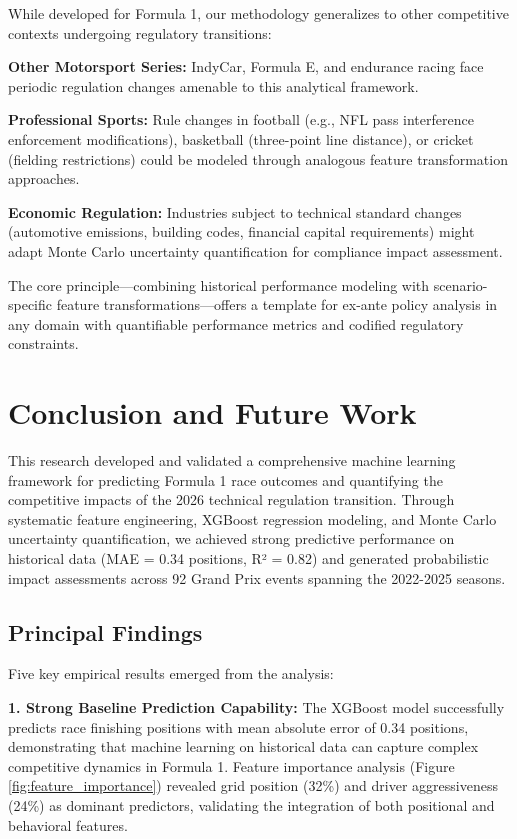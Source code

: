 \documentclass[conference]{IEEEtran}
\begin{document}
While developed for Formula 1, our methodology generalizes to other competitive contexts undergoing regulatory transitions:

\textbf{Other Motorsport Series:} IndyCar, Formula E, and endurance racing face periodic regulation changes amenable to this analytical framework.

\textbf{Professional Sports:} Rule changes in football (e.g., NFL pass interference enforcement modifications), basketball (three-point line distance), or cricket (fielding restrictions) could be modeled through analogous feature transformation approaches.

\textbf{Economic Regulation:} Industries subject to technical standard changes (automotive emissions, building codes, financial capital requirements) might adapt Monte Carlo uncertainty quantification for compliance impact assessment.

The core principle—combining historical performance modeling with scenario-specific feature transformations—offers a template for ex-ante policy analysis in any domain with quantifiable performance metrics and codified regulatory constraints.

\section{Conclusion and Future Work}

This research developed and validated a comprehensive machine learning framework for predicting Formula 1 race outcomes and quantifying the competitive impacts of the 2026 technical regulation transition. Through systematic feature engineering, XGBoost regression modeling, and Monte Carlo uncertainty quantification, we achieved strong predictive performance on historical data (MAE = 0.34 positions, R² = 0.82) and generated probabilistic impact assessments across 92 Grand Prix events spanning the 2022-2025 seasons.

\subsection{Principal Findings}

Five key empirical results emerged from the analysis:

\textbf{1. Strong Baseline Prediction Capability:} The XGBoost model successfully predicts race finishing positions with mean absolute error of 0.34 positions, demonstrating that machine learning on historical data can capture complex competitive dynamics in Formula 1. Feature importance analysis (Figure \ref{fig:feature_importance}) revealed grid position (32\%) and driver aggressiveness (24\%) as dominant predictors, validating the integration of both positional and behavioral features.
\end{document}
